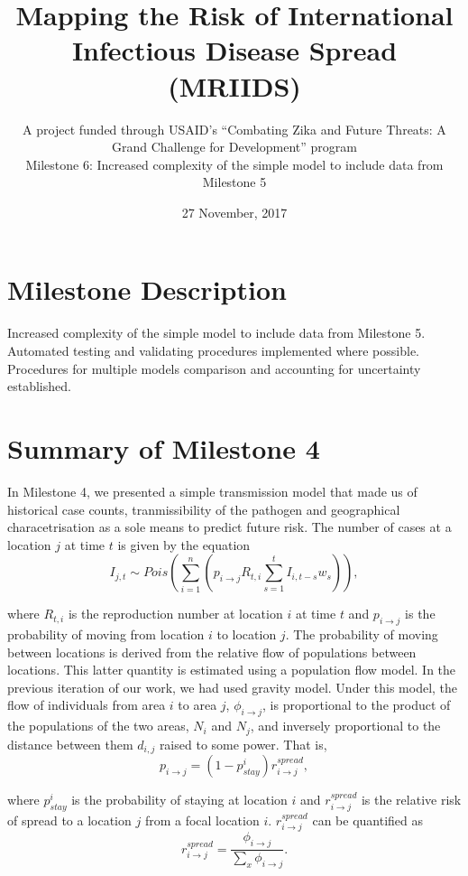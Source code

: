 \documentclass[11pt,]{article}
\title{Mapping the Risk of International Infectious Disease Spread
    (MRIIDS)}
\subtitle{A project funded through USAID’s ``Combating Zika and
    Future Threats: A Grand Challenge for Development'' program \\
    Milestone 6: Increased complexity of the simple model to include data from Milestone 5}
\author{}
\date{27 November, 2017}
\begin{document}
\maketitle
\tableofcontents

\newpage
\section{Milestone Description}\label{milestone-description}

Increased complexity of the simple model to include data from Milestone
5. Automated testing and validating procedures implemented where
possible. Procedures for multiple models comparison and accounting for
uncertainty established.

\section{Summary of Milestone 4}\label{summary-of-milestone-4}

In Milestone 4, we presented a simple transmission model that made us of
historical case counts, tranmissibility of the pathogen and geographical
characetrisation as a sole means to predict future risk. The number of
cases at a location \(j\) at time \(t\) is given by the equation \[
  I_{j, t} \sim Pois\left( \sum_{i = 1}^{n} {\left( p_{i \rightarrow j}
  R_{t, i} \sum_{s = 1}^{t}{I_{i, t - s} w_{s}}\right)} \right),
\]

where \(R_{t, i}\) is the reproduction number at location \(i\) at time
\(t\) and \(p_{i \rightarrow j}\) is the probability of moving from
location \(i\) to location \(j\). The probability of moving between
locations is derived from the relative flow of populations between
locations. This latter quantity is estimated using a population flow
model. In the previous iteration of our work, we had used gravity model.
Under this model, the flow of individuals from area \(i\) to area \(j\),
\(\phi_{i \rightarrow j}\), is proportional to the product of the
populations of the two areas, \(N_i\) and \(N_j\), and inversely
proportional to the distance between them \(d_{i, j}\) raised to some
power. That is,
\[  p_{i \rightarrow j} = (1 - p_{stay}^i) r_{i \rightarrow j}^{spread},\]

where \(p_{stay}^i\) is the probability of staying at location \(i\) and
\(r_{i \rightarrow j}^{spread}\) is the relative risk of spread to a
location \(j\) from a focal location \(i\).
\(r_{i \rightarrow j}^{spread}\) can be quantified as \[
  r_{i \rightarrow j}^{spread} = \frac{\phi_{i \rightarrow
  j}}{\sum_{x}{\phi_{i \rightarrow
  j}}}.
\]
\end{document}
